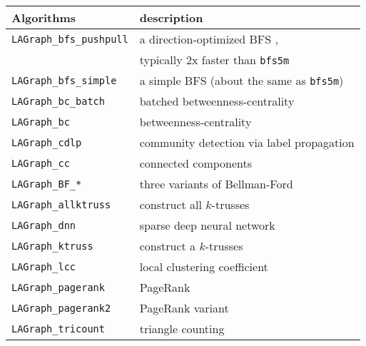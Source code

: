 \documentclass[12pt]{article}
\begin{document}
\vspace{0.1in}
{\small
\begin{tabular}{ll}
\hline
\hline
Algorithms & description \\
\hline
\hline
\verb'LAGraph_bfs_pushpull' & a direction-optimized BFS
                                \cite{Beamer:2012:DOB,Yang:2018:IPE}, \\
                            & typically 2x faster than \verb'bfs5m' \\
\verb'LAGraph_bfs_simple'   & a simple BFS (about the same as \verb'bfs5m') \\
\verb'LAGraph_bc_batch'     & batched betweenness-centrality \\
\verb'LAGraph_bc'           & betweenness-centrality \\
\verb'LAGraph_cdlp'         & community detection via label propagation \\
\verb'LAGraph_cc'           & connected components \\
\verb'LAGraph_BF_*'         & three variants of Bellman-Ford \\
\verb'LAGraph_allktruss'    & construct all $k$-trusses \\
\verb'LAGraph_dnn'          & sparse deep neural network \cite{DavisAznavehKolodziej19} \\
\verb'LAGraph_ktruss'       & construct a $k$-trusses \\
\verb'LAGraph_lcc'          & local clustering coefficient \\
\verb'LAGraph_pagerank'     & PageRank \\
\verb'LAGraph_pagerank2'    & PageRank variant \\
\verb'LAGraph_tricount'     & triangle counting \\
\end{tabular}}
\end{document}
